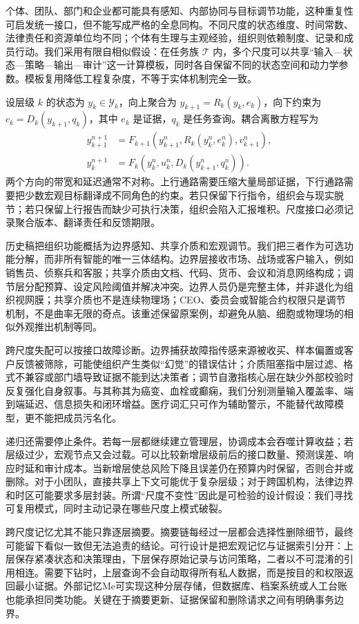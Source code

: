 个体、团队、部门和企业都可能具有感知、内部协同与目标调节功能，这种重复性可启发统一接口，但不能写成严格的全息同构。不同尺度的状态维度、时间常数、法律责任和资源单位均不同；个体有生理与主观经验，组织则依赖制度、记录和成员行动。我们采用有限自相似假设：在任务族 $\mathcal T$ 内，多个尺度可以共享“输入—状态—策略—输出—审计”这一计算模板，同时各自保留不同的状态空间和动力学参数。模板复用降低工程复杂度，不等于实体机制完全一致。

设层级 $k$ 的状态为 $y_k\in\mathcal Y_k$，向上聚合为 $y_{k+1}=R_k(y_k,e_k)$，向下约束为 $c_k=D_k(y_{k+1},q_k)$，其中 $e_k$ 是证据，$q_k$ 是任务查询。耦合离散方程写为
\begin{align}
y_{k+1}^{n+1}&=F_{k+1}(y_{k+1}^n,R_k(y_k^n,e_k^n),v_{k+1}^n),\\
y_k^{n+1}&=F_k(y_k^n,u_k^n,D_k(y_{k+1}^n,q_k^n)).
\end{align}
两个方向的带宽和延迟通常不对称。上行通路需要压缩大量局部证据，下行通路需要把少数宏观目标翻译成不同角色的约束。若只保留下行指令，组织会与现实脱节；若只保留上行报告而缺少可执行决策，组织会陷入汇报堆积。尺度接口必须记录聚合版本、翻译责任和反馈期限。

历史稿把组织功能概括为边界感知、共享介质和宏观调节。我们把三者作为可选功能分解，而非所有智能的唯一三体结构。边界层接收市场、战场或客户输入，例如销售员、侦察兵和客服；共享介质由文档、代码、货币、会议和消息网络构成；调节层分配预算、设定风险阈值并解决冲突。边界人员仍是完整主体，并非退化为组织视网膜；共享介质也不是连续物理场；CEO、委员会或智能合约权限只是调节机制，不是曲率无限的奇点。该重述保留原案例，却避免从脑、细胞或物理场的相似外观推出机制等同。

跨尺度失配可以按接口故障诊断。边界捕获故障指传感来源被收买、样本偏置或客户反馈被筛除，可能使组织产生类似“幻觉”的错误估计；介质阻塞指中层过滤、格式不兼容或部门墙导致证据不能到达决策者；调节自激指核心层在缺少外部校验时反复强化自身叙事。与其称其为癌变、血栓或癫痫，我们分别测量输入覆盖率、端到端延迟、信息损失和闭环增益。医疗词汇只可作为辅助警示，不能替代故障模型，更不能把成员污名化。

递归还需要停止条件。若每一层都继续建立管理层，协调成本会吞噬计算收益；若层级过少，宏观节点又会过载。可以比较新增层级前后的接口数量、预测误差、响应时延和审计成本。当新增层使总风险下降且误差仍在预算内时保留，否则合并或删除。对于小团队，直接共享上下文可能优于复杂层级；对于跨国机构，法律边界和时区可能要求多层封装。所谓“尺度不变性”因此是可检验的设计假设：我们寻找可复用模式，同时主动记录在哪些尺度上模式破裂。

跨尺度记忆尤其不能只靠逐层摘要。摘要链每经过一层都会选择性删除细节，最终可能留下看似一致但无法追责的结论。可行设计是把宏观记忆与证据索引分开：上层保存紧凑状态和决策理由，下层保存原始记录与访问策略，二者以不可混淆的引用相连。需要下钻时，上层查询不会自动取得所有私人数据，而是按目的和权限返回最小证据。外部记忆Me可实现这种分层存储，但数据库、档案系统或人工台账也能承担同类功能。关键在于摘要更新、证据保留和删除请求之间有明确事务边界。

